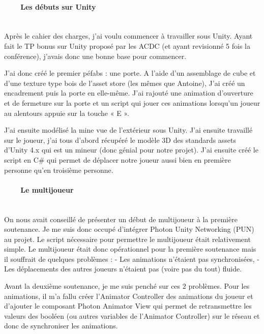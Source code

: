 \documentclass[titlepage, 13px, a4paper]{report}
\begin{document}
\paragraph{~~~~Les débuts sur Unity} \hspace{0pt}     \\
Après le cahier des charges, j’ai voulu commencer à travailler sous Unity. Ayant fait le TP bonus sur 
Unity proposé par les ACDC (et ayant revisionné 5 fois la conférence), j’avais donc une bonne base pour commencer.

J’ai donc créé le premier péfabs : une porte.
A l’aide d’un assemblage de cube et d’une texture type bois de l’asset store (les mêmes que Antoine), 
J’ai créé un encadrement puis la porte en elle-même. J’ai rajouté une animation d’ouverture et de fermeture 
sur la porte et un script qui jouer ces animations lorsqu’un joueur au alentours appuie sur la touche « E ».

J’ai ensuite modélisé la mine vue de l’extérieur sous Unity.
J’ai ensuite travaillé sur le joueur, j’ai tous d’abord récupéré le modèle 3D des standards assets d’Unity 4.x 
qui est un mineur (donc génial pour notre projet). J’ai ensuite créé le script en C\# qui permet de déplacer 
notre joueur aussi bien en première personne qu’en troisième personne. \\


\paragraph{~~~~Le multijoueur} \hspace{0pt} \\
On nous avait conseillé de présenter un début de multijoueur à la première soutenance. 
Je me suis donc occupé d’intégrer Photon Unity Networking (PUN) au projet.
Le script nécessaire pour permettre le multijoueur était relativement simple.
Le multijoueur était donc opérationnel pour la première soutenance mais il souffrait de quelques problèmes :
-	Les animations n’étaient pas synchronisées,
-	Les déplacements des autres joueurs n’étaient pas (voire pas du tout) fluide.

Avant la deuxième soutenance, je me suis penché sur ces 2 problèmes.
Pour les animations, il m’a fallu créer l’Animator Controller des animations du joueur et d’ajouter 
le composant Photon Animator View qui permet de retransmettre les valeurs des booléen (ou autres variables 
de l’Animator Controller) sur le réseau et donc de synchroniser les animations. \\
\end{document}
